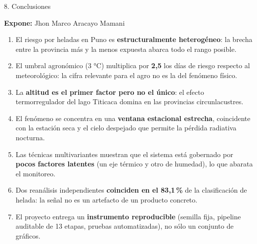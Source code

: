 \documentclass[aspectratio=169,11pt]{beamer}
\newcommand{\ponente}[1]{%
  \begin{flushright}\tiny\textcolor{pnBrandDark}{\textbf{Expone:} #1}\end{flushright}%
  \vspace{-0.9em}%
}
\begin{document}
\begin{frame}{8. Conclusiones}
  \ponente{Jhon Marco Aracayo Mamani}
  \small
  \begin{enumerate}\itemsep0.35em
    \item El riesgo por heladas en Puno es \textbf{estructuralmente heterogéneo}: la brecha entre la
          provincia más y la menos expuesta abarca todo el rango posible.
    \item El umbral agronómico (3 °C) multiplica por \textbf{2,5} los días de riesgo respecto al
          meteorológico: la cifra relevante para el agro no es la del fenómeno físico.
    \item La \textbf{altitud es el primer factor pero no el único}: el efecto termorregulador del
          lago Titicaca domina en las provincias circunlacustres.
    \item El fenómeno se concentra en una \textbf{ventana estacional estrecha}, coincidente con la
          estación seca y el cielo despejado que permite la pérdida radiativa nocturna.
    \item Las técnicas multivariantes muestran que el sistema está gobernado por \textbf{pocos
          factores latentes} (un eje térmico y otro de humedad), lo que abarata el monitoreo.
    \item Dos reanálisis independientes \textbf{coinciden en el 83,1\,\%} de la clasificación de
          helada: la señal no es un artefacto de un producto concreto.
    \item El proyecto entrega un \textbf{instrumento reproducible} (semilla fija, pipeline
          auditable de 13 etapas, pruebas automatizadas), no sólo un conjunto de gráficos.
  \end{enumerate}
\end{frame}
\end{document}
